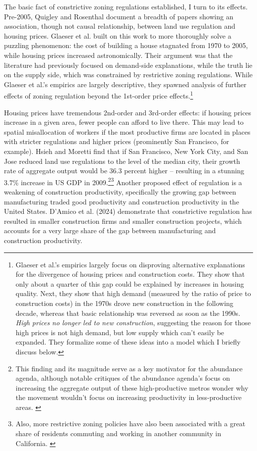 \documentclass{article}[11pt]
\begin{document}
The basic fact of constrictive zoning regulations established, I turn to its effects. Pre-2005, Quigley and Rosenthal document a breadth of papers showing an association, though not causal relationship, between land use regulation and housing prices. \citep{quigley2005effects} Glaeser et al. built on this work to more thoroughly solve a puzzling phenomenon: the cost of building a house stagnated from 1970 to 2005, while housing prices increased astronomically. \citep{glaeser2005empirical} Their argument was that the literature had previously focused on demand-side explanations, while the truth lie on the supply side, which was constrained by restrictive zoning regulations. While Glaeser et al.'s empirics are largely descriptive, they spawned analysis of further effects of zoning regulation beyond the 1st-order price effects.\footnote{Glaeser et al.'s empirics largely focus on disproving alternative explanations for the divergence of housing prices and construction costs. They show that only about a quarter of this gap could be explained by increases in housing quality. Next, they show that high demand (measured by the ratio of price to construction costs) in the 1970s drove new construction in the following decade, whereas that basic relationship was reversed as soon as the 1990s. \textit{High prices no longer led to new construction}, suggesting the reason for those high prices is not high demand, but low supply which can't easily be expanded. They formalize some of these ideas into a model which I briefly discuss below.} 

Housing prices have tremendous 2nd-order and 3rd-order effects: if housing prices increase in a given area, fewer people can afford to live there. This may lead to spatial misallocation of workers if the most productive firms are located in places with stricter regulations and higher prices (prominently San Francisco, for example). Hsieh and Moretti find that if San Francisco, New York City, and San Jose reduced land use regulations to the level of the median city, their growth rate of aggregate output would be 36.3 percent higher -- resulting in a stunning 3.7\% increase in US GDP in 2009.\footnote{This finding and its magnitude serve as a key motivator for the abundance agenda, although notable critiques of the abundance agenda's focus on increasing the aggregate output of these high-productive metros wonder why the movement wouldn't focus on increasing productivity in less-productive areas. \citep{abundanceambiguity}}\footnote{Also, more restrictive zoning policies have also been associated with a great share of residents commuting and working in another community in California. \citep{durst2021land}}  \citep{hsieh2019housing} Another proposed effect of regulation is a weakening of construction productivity, specifically the growing gap between manufacturing traded good productivity and construction productivity in the United States. D'Amico et al. (2024) demonstrate that constrictive regulation has resulted in smaller construction firms and smaller construction projects, which accounts for a very large share of the gap between manufacturing and construction productivity. \citep{d2024has}
\end{document}
